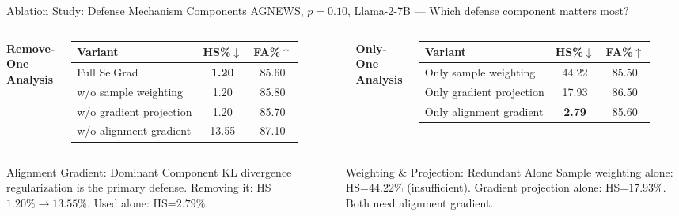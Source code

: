 \documentclass[aspectratio=169, 11pt]{beamer}
\begin{document}
\begin{frame}{Ablation Study: Defense Mechanism Components}
\vspace{4pt}
\centering
{\small AGNEWS, $p{=}0.10$, Llama-2-7B --- Which defense component matters most?}
\vspace{4pt}

\begin{columns}[T]
\centering
{\small\textbf{Remove-One Analysis}}
\vspace{2pt}
\renewcommand{\arraystretch}{1.2}
\footnotesize
\begin{tabular}{lcc}
\toprule
\textbf{Variant} & \textbf{HS\%$\downarrow$} & \textbf{FA\%$\uparrow$} \\
\midrule
Full SelGrad & \textbf{1.20} & 85.60 \\
w/o sample weighting & 1.20 & 85.80 \\
w/o gradient projection & 1.20 & 85.70 \\
\rowcolor{red!10}
w/o alignment gradient & \textcolor{dangerred}{13.55} & 87.10 \\
\bottomrule
\end{tabular}

\centering
{\small\textbf{Only-One Analysis}}
\vspace{2pt}
\renewcommand{\arraystretch}{1.2}
\footnotesize
\begin{tabular}{lcc}
\toprule
\textbf{Variant} & \textbf{HS\%$\downarrow$} & \textbf{FA\%$\uparrow$} \\
\midrule
\rowcolor{red!10}
Only sample weighting & \textcolor{dangerred}{44.22} & 85.50 \\
Only gradient projection & 17.93 & 86.50 \\
\rowcolor{green!10}
Only alignment gradient & \textbf{2.79} & 85.60 \\
\bottomrule
\end{tabular}
\end{columns}

\vspace{6pt}
\begin{columns}[T]
\begin{exampleblock}{\small Alignment Gradient: Dominant Component}
\small KL divergence regularization is the primary defense. Removing it: HS $1.20\% \to 13.55\%$. Used alone: HS=$2.79\%$.
\end{exampleblock}

\begin{alertblock}{\small Weighting \& Projection: Redundant Alone}
\small Sample weighting alone: HS=$44.22\%$ (insufficient). Gradient projection alone: HS=$17.93\%$. Both need alignment gradient.
\end{alertblock}
\end{columns}
\end{frame}
\end{document}
